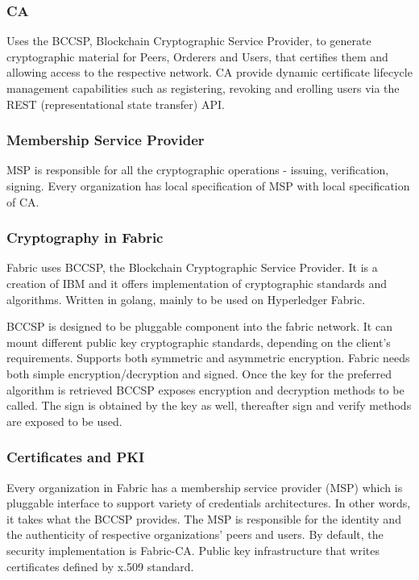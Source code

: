 \documentclass[a4paper,11pt]{report}
\begin{document}
 
\subsubsection{CA}

Uses the BCCSP, Blockchain Cryptographic Service Provider, to generate cryptographic material for Peers, Orderers and Users, that certifies them and allowing access to the respective network. CA provide dynamic certificate lifecycle management capabilities such as registering, revoking and erolling users via the REST (representational state transfer) API.\cite{mencias2018optimized}

\subsubsection{Membership Service Provider}

MSP is responsible for all the cryptographic operations - issuing, verification, signing. Every organization has local specification of MSP with local specification of CA. 

\subsubsection{Cryptography in Fabric }

	Fabric uses BCCSP, the Blockchain Cryptographic Service Provider. It is a creation of IBM and it offers implementation of cryptographic standards and algorithms. Written in golang, mainly to be used on Hyperledger Fabric. 

	BCCSP is designed to be pluggable component into the fabric network. It can mount different public key cryptographic standards, depending on the client's requirements. Supports both symmetric and asymmetric encryption. 
Fabric needs both simple encryption/decryption and signed. Once the key for the preferred algorithm is retrieved BCCSP exposes encryption and decryption methods to be called. The sign is obtained by the key as well, thereafter sign and verify methods are exposed to be used. \cite{bccsp}


\subsubsection{Certificates and PKI}
	Every organization in Fabric has a membership service provider (MSP) which is pluggable interface to support variety of credentials architectures. In other words, it takes what the BCCSP provides. The MSP is responsible for the identity and the authenticity of respective organizations' peers and users. By default, the security implementation is Fabric-CA. Public key infrastructure that writes certificates defined by x.509 standard.
\end{document}
